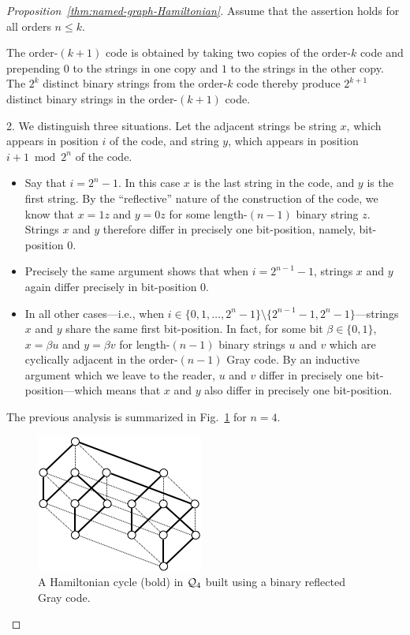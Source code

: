 \begin{proof}[Proposition~\ref{thm:named-graph-Hamiltonian}]
Assume that the assertion holds for all orders $n \leq k$.

The order-$(k+1)$ code is obtained by taking two copies of the order-$k$ code and prepending $0$ to the strings in one copy and $1$ to the strings in the other copy.  The $2^k$ distinct binary strings from the order-$k$ code thereby produce $2^{k+1}$ distinct binary strings in the order-$(k+1)$ code.

\medskip

 2.
We distinguish three situations.  Let the adjacent strings be string $x$, which appears in position $i$ of the code, and string $y$, which appears in position $i+1 \bmod 2^n$ of the code.
  \begin{itemize}
  \item
Say that $i = 2^n-1$.  In this case $x$ is the last string in the code, and $y$ is the first string.  By the ``reflective'' nature of the construction of the code, we know that $x = 1z$ and $y = 0z$ for some length-$(n-1)$ binary string $z$.  Strings $x$ and $y$ therefore differ in precisely one bit-position, namely, bit-position $0$.

  \medskip\item
Precisely the same argument shows that when $i = 2^{n-1} -1$, strings $x$ and $y$ again differ precisely in bit-position $0$.

  \medskip\item
In all other cases---i.e., when $i \in \{0,1, \ldots, 2^n-1\} \setminus \{2^{n-1} -1, 2^n-1\}$---strings  $x$ and $y$ share the same first bit-position.  In fact, for some bit $\beta \in \{0,1\}$, $x = \beta u$ and $y = \beta v$ for length-$(n-1)$ binary strings $u$ and $v$ which are cyclically adjacent in the order-$(n-1)$ Gray code.  By an inductive argument which we leave to the reader, $u$ and $v$ differ in precisely one bit-position---which means that $x$ and $y$ also differ in precisely one bit-position.
  \end{itemize}
The previous analysis is summarized in Fig.~\ref{fig:HamiltonHypercude} for $n=4$.
  \begin{figure}[hbt]
\begin{center}
       \includegraphics[scale=0.5]{FiguresGraph/HamiltonHypercube}
       \caption{A Hamiltonian cycle (bold) in $\mbox{$\cal Q$}_4$ built using a binary reflected Gray code.}
  \label{fig:HamiltonHypercude}
\end{center}
\end{figure}


\end{proof}
